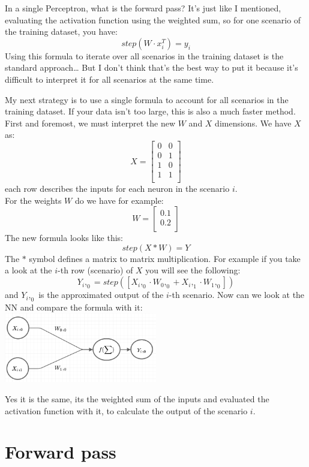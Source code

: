 \documentclass[
]{book}
\begin{document}
In a single Perceptron, what is the forward pass? It's just like I mentioned, evaluating the activation function using the weighted sum, so for one scenario of the training dataset, you have:
\[
  step(W \cdot x^T_i) = y_i
\]
Using this formula to iterate over all scenarios in the training dataset is the standard approach\ldots{}
But I don't think that's the best way to put it because it's difficult to interpret it for all scenarios at the same time.

My next strategy is to use a single formula to account for all scenarios in the training dataset. If your data isn't too large, this is also a much faster method. First and foremost, we must interpret the new \(W\) and \(X\) dimensions.
We have \(X\) as:
\[
  X = \left[
  \begin{array}{cc}
  0 & 0 \\
  0 & 1 \\
  1 & 0 \\
  1 & 1 \\
  \end{array}
  \right]
\]
each row describes the inputs for each neuron in the scenario \(i\).\\
For the weights \(W\) do we have for example:
\[
  W =\left[
  \begin{array}{c}
  0.1 \\ 
  0.2 \\ 
  \end{array}
  \right]
\]
The new formula looks like this:
\[
  step(X * W) = Y
\]
The \(*\) symbol defines a matrix to matrix multiplication. For example if you take a look at the \(i\)-th row (scenario) of \(X\) you will see the following:
\[
  Y_i,_0 = step([X_i,_0 \cdot W_0,_0 + X_i,_1 \cdot W_1,_0 ])
\]
and \(Y_i,_0\) is the approximated output of the \(i\)-th scenario. Now can we look at the NN and compare the formula with it:\\
\includegraphics[width=0.5\textwidth,height=\textheight]{./img/NN_01_v4.png}

Yes it is the same, its the weighted sum of the inputs and evaluated the activation function with it, to calculate the output of the scenario \(i\).

\hypertarget{forward-pass}{%
\section{Forward pass}\label{forward-pass}}
\end{document}
